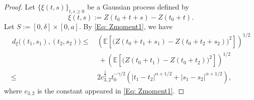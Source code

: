 \documentclass[11pt, reqno]{amsart}
\numberwithin{equation}{section}
\newcommand{\1}{{\bf 1}}
\newcommand{\2}{{\bf 2}}
\begin{document}
   \begin{proof} Let    $\{\xi(t,s)\}_{t, s\ge0}$ be a Gaussian process defined by
   $$\xi(t,s):=Z(t_0+t+s)-Z(t_0+t).$$
  Let $S:=[0,\delta]\times[0,a]$. By  \eqref{Eq: Zmoment1},    we have 
   \begin{equation*}
   \begin{split}
    \, d_{\xi}\big((t_1, s_1), (t_2, s_2)\big)
   \le&\,   \left(\mathbb E\left[\big(Z(t_0+t_1+s_1)-Z(t_0+t_2+s_2)\big)^2 \right]\right)^{1/2}\\
   &\, \, +  \left(\mathbb E\left[\big(Z(t_0+t_1)- {Z}(t_0+t_2)\big)^2 \right]\right)^{1/2}\\
   \le &\,  2c_{3,2}^{\frac12}t_0^{-\gamma/2}\left(|t_1-t_2|^{\alpha+1/2}+|s_1-s_2|^{\alpha+1/2}\right),
   \end{split}
   \end{equation*} 
   where $c_{3,2}$ is the constant appeared in \eqref{Eq: Zmoment1}.
   

\end{proof}
\end{document}
